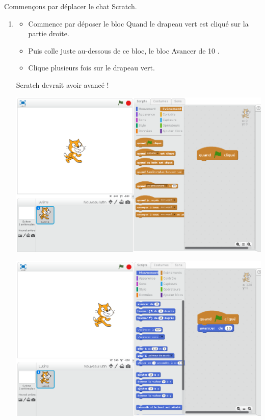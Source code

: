 \documentclass[class=report,crop=false, 12pt]{standalone}
\begin{document}




\bigskip
\bigskip


\begin{activite}

Commençons par déplacer le chat Scratch.

\begin{enumerate}
  \item
  \begin{itemize}
    \item Commence par déposer le bloc \og Quand le drapeau vert est cliqué \fg{} sur la partie droite.
    \item Puis colle juste au-dessous de ce bloc, le bloc \og Avancer de 10 \fg{}.
    \item Clique plusieurs fois sur le drapeau vert. 
  \end{itemize}

Scratch devrait avoir avancé !

\begin{center}
  \includegraphics[scale=\scaleecran]{ecran-01-ex1a}

  \includegraphics[scale=\scaleecran]{ecran-01-ex1b}
\end{center}  
  

\end{enumerate}
\end{activite}
\end{document}
